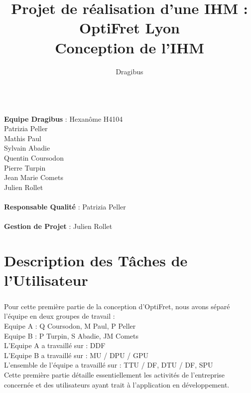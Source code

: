 \documentclass{report}
\begin{document}
\title {Projet de réalisation d'une IHM : OptiFret Lyon \\ Conception de l'IHM}
\author{Dragibus}
\maketitle


\pagebreak
~~\\
\textbf{Equipe Dragibus} : Hexanôme H4104 \\
Patrizia Peller\\
Mathis Paul\\
Sylvain Abadie\\
Quentin Coursodon\\
Pierre Turpin\\
Jean Marie Comets\\
Julien Rollet\\

~~\\
\textbf{Responsable Qualité} : Patrizia Peller\\
~~\\
\textbf{Gestion de Projet} : Julien Rollet\\


\tableofcontents



\chapter{Description des Tâches de l'Utilisateur}

\paragraph{}
Pour cette première partie de la conception d'OptiFret, nous avons séparé l'équipe en deux groupes de travail :\\
Equipe A : Q Coursodon, M Paul, P Peller \\
Equipe B : P Turpin, S Abadie, JM Comets\\

L'Equipe A a travaillé sur : DDF \\

L'Equipe B a travaillé sur : MU / DPU / GPU \\

L’ensemble de l’équipe a travaillé sur : TTU / DF, DTU / DF, SPU \\


Cette première partie détaille essentiellement les activités de l'entreprise concernée et des utilisateurs ayant trait à l'application en développement.
\end{document}
